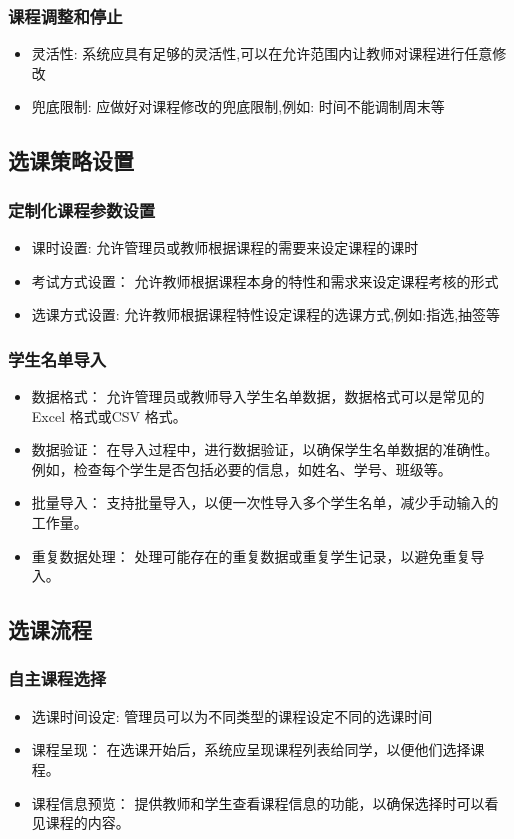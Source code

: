 \documentclass{article}
\begin{document}
\subsubsection{课程调整和停止}
\begin{itemize}
        \item 灵活性: 系统应具有足够的灵活性,可以在允许范围内让教师对课程进行任意修改
        \item 兜底限制: 应做好对课程修改的兜底限制,例如: 时间不能调制周末等
\end{itemize}

\subsection{选课策略设置}
\subsubsection{定制化课程参数设置}
\begin{itemize}
        \item 课时设置: 允许管理员或教师根据课程的需要来设定课程的课时
        \item 考试方式设置： 允许教师根据课程本身的特性和需求来设定课程考核的形式
        \item 选课方式设置: 允许教师根据课程特性设定课程的选课方式,例如:指选,抽签等
\end{itemize}
\subsubsection{学生名单导入}
\begin{itemize}
        \item 数据格式： 允许管理员或教师导入学生名单数据，数据格式可以是常见的 Excel 格式或CSV 格式。
        \item 数据验证： 在导入过程中，进行数据验证，以确保学生名单数据的准确性。例如，检查每个学生是否包括必要的信息，如姓名、学号、班级等。
        \item 批量导入： 支持批量导入，以便一次性导入多个学生名单，减少手动输入的工作量。
        \item 重复数据处理： 处理可能存在的重复数据或重复学生记录，以避免重复导入。
\end{itemize}

\subsection{选课流程}
\subsubsection{自主课程选择}
\begin{itemize}
        \item 选课时间设定: 管理员可以为不同类型的课程设定不同的选课时间
        \item 课程呈现： 在选课开始后，系统应呈现课程列表给同学，以便他们选择课程。
        \item 课程信息预览： 提供教师和学生查看课程信息的功能，以确保选择时可以看见课程的内容。
\end{itemize}
 
\end{document}
